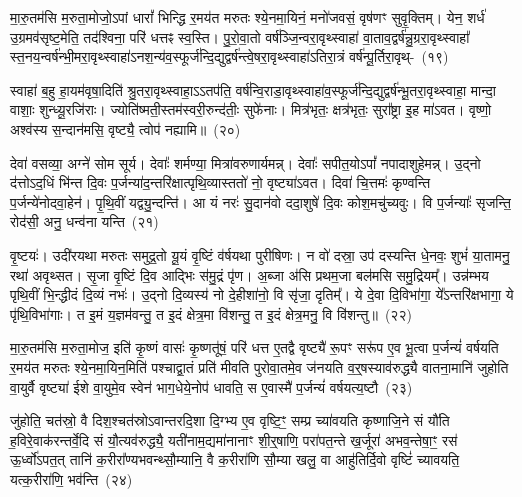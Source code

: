 मा॒रु॒तम॑सि म॒रुता॒मोजो॒\-ऽपां धारां᳚ भिन्द्धि र॒मय॑त मरुतः श्ये॒न\-मा॒यिनं॒ मनो॑जवसं॒ वृष॑णꣳ सुवृ॒क्तिम्। येन॒ शर्ध॑ उ॒ग्र\-मव॑\-सृष्ट॒मेति॒ तद॑श्विना॒ परि॑ धत्तꣴ स्व॒स्ति। पु॒रो॒\-वा॒तो वर्\mbox{}ष॑ञ्जि॒न्वरा॒\-वृथ्\-स्वाहा॑ वा॒ता\-व॒द्वर्\mbox{}ष॑न्नु॒ग्ररा॒वृथ्\-स्वाहा᳚ स्त॒न\-य॒न्वर्\mbox{}ष॑न्भी॒म\-रा॒\-वृथ्\-स्वाहा॑\-ऽन\-श॒न्य॑व॒\-स्फूर्ज॑न्दि॒द्युद्वर्\mbox{}ष॑न्त्वे॒ष\-रा॒\-वृथ्\-स्वाहा॑\-ऽतिरा॒त्रं वर्\mbox{}ष॑न्पू॒र्तिरा॒वृथ्-~(१९)\ip

स्वाहा॑ ब॒हु हा॒यम॑वृषा॒दिति॑ श्रु॒तरा॒वृथ्\-स्वाहा॒\-ऽऽ\-तप॑ति॒ वर्\mbox{}ष॑न्वि॒राडा॒वृथ्\-स्वाहा॑\-व॒स्फूर्ज॑न्दि॒द्युद्वर्\mbox{}ष॑न्भू॒तरा॒वृथ्\-स्वाहा॒ मान्दा॒ वाशाः॒ शुन्ध्यू॒रजि॑राः। ज्योति॑ष्मती॒स्तम॑स्वरी॒रुन्द॑तीः॒ सुफे॑नाः। मित्र॑भृतः॒ क्षत्र॑भृतः॒ सुरा᳚ष्ट्रा इ॒ह मा॑\-ऽवत। वृष्णो॒ अश्व॑स्य स॒न्दान॑मसि॒ वृष्ट्यै॒ त्वोप॑ नह्यामि॥~(२०)\ip

{\anuvakamend[{पू॒र्तिरा॒वृद्द्विच॑त्वारिꣳशच्च}]}

देवा॑ वसव्या॒ अग्ने॑ सोम सूर्य। देवाः᳚ शर्मण्या॒ मित्रा॑वरुणार्यमन्न्। देवाः᳚ सपीत॒यो\-ऽपां᳚ नपादाशुहेमन्न्। उ॒द्नो द॑त्तो\-ऽद॒धिं भि॑न्त दि॒वः प॒र्जन्या॑\-द॒न्त\-रि॑क्षात्पृथि॒व्यास्ततो॑ नो॒ वृष्ट्या॑\-ऽवत। दिवा॑ चि॒त्तमः॑ कृण्वन्ति प॒र्जन्ये॑नोदवा॒हेन॑। पृ॒थि॒वीं यद्व्यु॒न्दन्ति॑। आ यं नरः॑ सु॒दान॑वो ददा॒शुषे॑ दि॒वः कोश॒मचु॑च्यवुः। वि प॒र्जन्याः᳚ सृजन्ति॒ रोद॑सी॒ अनु॒ धन्व॑ना यन्ति~(२१)\ip

वृ॒ष्टयः॑। उदी॑रयथा मरुतः समुद्र॒तो यू॒यं वृ॒ष्टिं व॑र्\mbox{}षयथा पुरीषिणः। न वो॑ दस्रा॒ उप॑ दस्यन्ति धे॒नवः॒ शुभं॑ या॒तामनु॒ रथा॑ अवृथ्सत। सृ॒जा वृ॒ष्टिं दि॒व आद्भिः स॑मु॒द्रं पृ॑ण। अ॒ब्जा अ॑सि प्रथम॒जा बल॑मसि समु॒द्रियम्᳚। उन्न॑म्भय पृथि॒वीं भि॒न्द्धीदं दि॒व्यं नभः॑। उ॒द्नो दि॒व्यस्य॑ नो दे॒हीशा॑नो॒ वि सृ॑जा॒ दृतिम्᳚। ये दे॒वा दि॒विभा॑गा॒ ये᳚\-ऽन्तरि॑क्षभागा॒ ये पृ॑थि॒विभा॑गाः। त इ॒मं य॒ज्ञम॑वन्तु॒ त इ॒दं क्षेत्र॒मा वि॑शन्तु॒ त इ॒दं क्षेत्र॒मनु॒ वि वि॑शन्तु॥~(२२)\ip

{\anuvakamend[{य॒न्ति॒ दे॒वा विꣳ॑शति॒श्च॑}]}

मा॒रु॒तम॑सि म॒रुता॒मोज॒ इति॑ कृ॒ष्णं वासः॑ कृ॒ष्णतू॑षं॒ परि॑ धत्त ए॒तद्वै वृष्ट्यै॑ रू॒पꣳ सरू॑प ए॒व भू॒त्वा प॒र्जन्यं॑ वर्\mbox{}षयति र॒मय॑त मरुतः श्ये॒नमा॒यिन॒मिति॑ पश्चाद्वा॒तं प्रति॑ मीवति पुरोवा॒तमे॒व ज॑नयति व॒र्॒\mbox{}षस्याव॑रुद्ध्यै वातना॒मानि॑ जुहोति वा॒युर्वै वृष्ट्या॑ ईशे वा॒युमे॒व स्वेन॑ भाग॒\-धेये॒नोप॑ धावति॒ स ए॒वास्मै॑ प॒र्जन्यं॑ वर्\mbox{}षयत्य॒ष्टौ~(२३)\ip

जु॑होति॒ चत॑स्रो॒ वै दिश॒श्चत॑स्रो\-ऽवान्तरदि॒शा दि॒ग्भ्य ए॒व वृष्टि॒ꣳ॒ सम्प्र च्या॑वयति कृष्णाजि॒ने सं यौ॑ति ह॒विरे॒वाक॑रन्तर्वे॒दि सं यौ॒त्यव॑रुद्ध्यै॒ यती॑नाम॒द्यमा॑नानाꣳ शी॒र्॒\mbox{}षाणि॒ परा॑पत॒न्ते ख॒र्जूरा॑ अभव॒न्तेषा॒ꣳ॒ रस॑ ऊ॒र्ध्वो॑\-ऽपत॒त् तानि॑ क॒रीरा᳚ण्यभवन्थ्सौ॒म्यानि॒ वै क॒रीरा॑णि सौ॒म्या खलु॒ वा आहु॑तिर्दि॒वो वृष्टिं॑ च्यावयति॒ यत्क॒रीरा॑णि॒ भव॑न्ति~(२४)\ip

